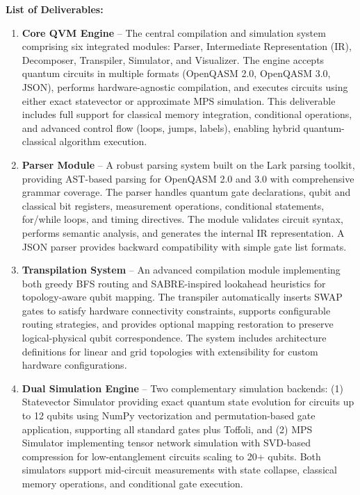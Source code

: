\textbf{List of Deliverables:}

\begin{enumerate}
    \item \textbf{Core QVM Engine} – The central compilation and simulation system comprising six integrated modules: Parser, Intermediate Representation (IR), Decomposer, Transpiler, Simulator, and Visualizer. The engine accepts quantum circuits in multiple formats (OpenQASM 2.0, OpenQASM 3.0, JSON), performs hardware-agnostic compilation, and executes circuits using either exact statevector or approximate MPS simulation. This deliverable includes full support for classical memory integration, conditional operations, and advanced control flow (loops, jumps, labels), enabling hybrid quantum-classical algorithm execution.

    \item \textbf{Parser Module} – A robust parsing system built on the Lark parsing toolkit, providing AST-based parsing for OpenQASM 2.0 and 3.0 with comprehensive grammar coverage. The parser handles quantum gate declarations, qubit and classical bit registers, measurement operations, conditional statements, for/while loops, and timing directives. The module validates circuit syntax, performs semantic analysis, and generates the internal IR representation. A JSON parser provides backward compatibility with simple gate list formats.

    \item \textbf{Transpilation System} – An advanced compilation module implementing both greedy BFS routing and SABRE-inspired lookahead heuristics for topology-aware qubit mapping. The transpiler automatically inserts SWAP gates to satisfy hardware connectivity constraints, supports configurable routing strategies, and provides optional mapping restoration to preserve logical-physical qubit correspondence. The system includes architecture definitions for linear and grid topologies with extensibility for custom hardware configurations.

    \item \textbf{Dual Simulation Engine} – Two complementary simulation backends: (1) Statevector Simulator providing exact quantum state evolution for circuits up to 12 qubits using NumPy vectorization and permutation-based gate application, supporting all standard gates plus Toffoli, and (2) MPS Simulator implementing tensor network simulation with SVD-based compression for low-entanglement circuits scaling to 20+ qubits. Both simulators support mid-circuit measurements with state collapse, classical memory operations, and conditional gate execution.


\end{enumerate}
